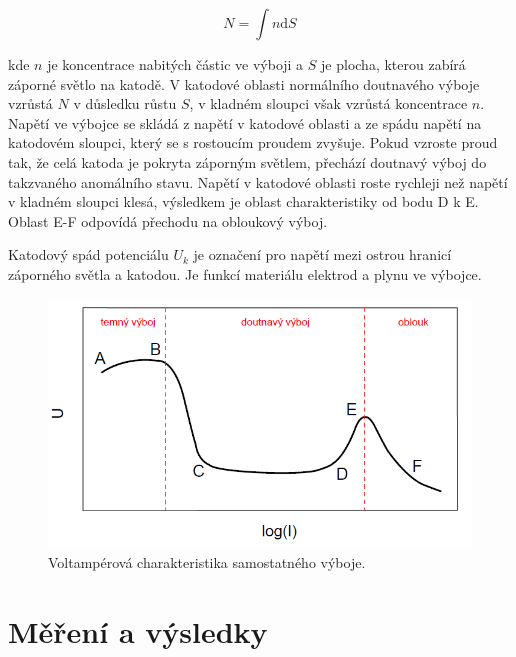 \documentclass[a4paper,12pt]{article}
\begin{document}
\begin{equation}
	N = \int n \text{d}S
	\label{10}
\end{equation}

kde $n$ je koncentrace nabitých částic ve výboji a $S$ je plocha, kterou zabírá záporné světlo na katodě. V katodové oblasti normálního doutnavého výboje vzrůstá $N$ v důsledku růstu $S$, v kladném sloupci však vzrůstá koncentrace $n$. Napětí ve výbojce se skládá z napětí v katodové oblasti a ze spádu napětí na katodovém sloupci, který se s rostoucím proudem zvyšuje. Pokud vzroste proud tak, že celá katoda je pokryta záporným světlem, přechází doutnavý výboj do takzvaného anomálního stavu. Napětí v katodové oblasti roste rychleji než napětí v kladném sloupci klesá, výsledkem je oblast charakteristiky od bodu D k E. Oblast E-F odpovídá přechodu na obloukový výboj.

Katodový spád potenciálu $U_k$ je označení pro napětí mezi ostrou hranicí záporného světla a katodou. Je funkcí materiálu elektrod a plynu ve výbojce. 

\begin{figure}[h]
	\centering
	\includegraphics[width=130mm]{VA.png}
	\caption{Voltampérová charakteristika samostatného výboje.}
	\label{VA}
\end{figure}




\section{Měření a výsledky}
\end{document}
